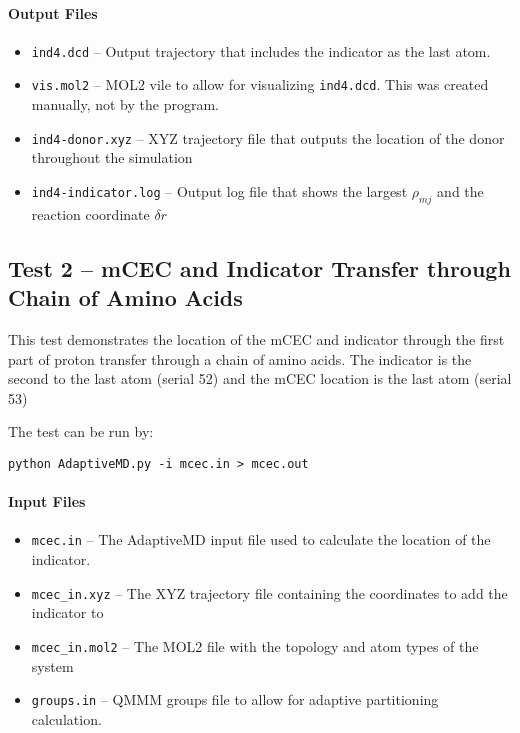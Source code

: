 \documentclass{article}
\begin{document}
\paragraph{Output Files}
\begin{itemize}
\item \texttt{ind4.dcd} -- Output trajectory that includes the indicator as the last atom.
\item \texttt{vis.mol2} -- MOL2 vile to allow for visualizing \texttt{ind4.dcd}. This was created manually, not by the program.
\item \texttt{ind4-donor.xyz} -- XYZ trajectory file that outputs the location of the donor throughout the simulation
\item \texttt{ind4-indicator.log} -- Output log file that shows the largest $\rho_{mj}$ and the reaction coordinate $\delta r$
\end{itemize}

\subsection{Test 2 -- mCEC and Indicator Transfer through Chain of Amino Acids}
This test demonstrates the location of the mCEC and indicator through the first part of proton transfer through a chain of amino acids.
The indicator is the second to the last atom (serial 52) and the mCEC location is the last atom (serial 53)

The test can be run by:

\texttt{python AdaptiveMD.py -i mcec.in > mcec.out}

\paragraph{Input Files}
\begin{itemize}
\item \texttt{mcec.in} -- The AdaptiveMD input file used to calculate the location of the indicator.
\item \texttt{mcec\_in.xyz} -- The XYZ trajectory file containing the coordinates to add the indicator to
\item \texttt{mcec\_in.mol2} -- The MOL2 file with the topology and atom types of the system
\item \texttt{groups.in} -- \textsc{QMMM} groups file to allow for adaptive partitioning calculation.
\end{itemize}
\end{document}

